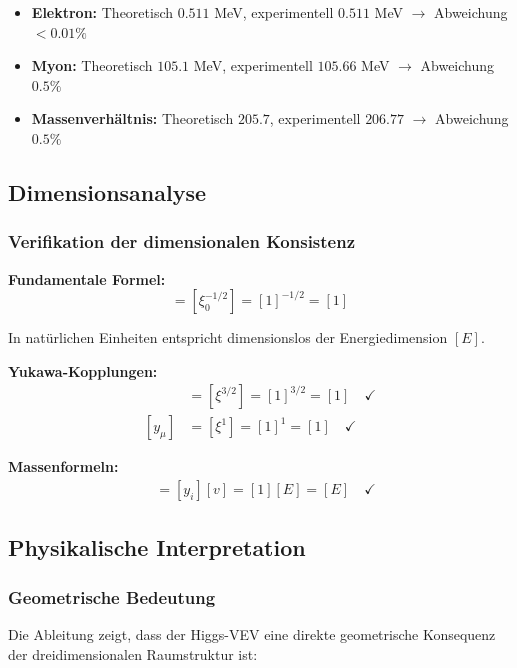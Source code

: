 \begin{itemize}
	\item \textbf{Elektron:} Theoretisch $0.511$ MeV, experimentell $0.511$ MeV $\rightarrow$ Abweichung $< 0.01\%$
	\item \textbf{Myon:} Theoretisch $105.1$ MeV, experimentell $105.66$ MeV $\rightarrow$ Abweichung $0.5\%$
	\item \textbf{Massenverhältnis:} Theoretisch $205.7$, experimentell $206.77$ $\rightarrow$ Abweichung $0.5\%$
\end{itemize}

\subsection{Dimensionsanalyse}

\subsubsection{Verifikation der dimensionalen Konsistenz}

\textbf{Fundamentale Formel:}
\begin{equation}
	[v] = [\xi_0^{-1/2}] = [1]^{-1/2} = [1]
\end{equation}

In natürlichen Einheiten entspricht dimensionslos der Energiedimension $[E]$.

\textbf{Yukawa-Kopplungen:}
\begin{align}
	[y_e] &= [\xi^{3/2}] = [1]^{3/2} = [1] \quad \checkmark\\
	[y_\mu] &= [\xi^1] = [1]^1 = [1] \quad \checkmark
\end{align}

\textbf{Massenformeln:}
\begin{align}
	[m_i] &= [y_i][v] = [1][E] = [E] \quad \checkmark
\end{align}

\subsection{Physikalische Interpretation}

\subsubsection{Geometrische Bedeutung}

Die Ableitung zeigt, dass der Higgs-VEV eine direkte geometrische Konsequenz der dreidimensionalen Raumstruktur ist:

